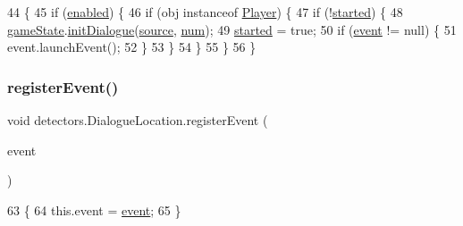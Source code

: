 \begin{DoxyCode}
44                                        \{
45         \textcolor{keywordflow}{if} (\mbox{\hyperlink{classdetectors_1_1_dialogue_location_a724e4fa1eb635dc794cc3a3fde90e947}{enabled}}) \{
46             \textcolor{keywordflow}{if} (obj instanceof \mbox{\hyperlink{class_player}{Player}}) \{
47                 \textcolor{keywordflow}{if} (!\mbox{\hyperlink{classdetectors_1_1_dialogue_location_a980ab73233584dd2c3f336cfea0c8662}{started}}) \{
48                     \mbox{\hyperlink{classdetectors_1_1_dialogue_location_a12ac7bef754e0189f746c02f7d82f5e7}{gameState}}.\mbox{\hyperlink{classstates_1_1_game_state_a5561200f7d5c881b84ce6369f6fad705}{initDialogue}}(\mbox{\hyperlink{classdetectors_1_1_dialogue_location_a55abbd4dc425d54ce35dfae63bd1b1e0}{source}}, 
      \mbox{\hyperlink{classdetectors_1_1_dialogue_location_ab19469a81933f3e7295fa59d70ac1f1b}{num}});
49                     \mbox{\hyperlink{classdetectors_1_1_dialogue_location_a980ab73233584dd2c3f336cfea0c8662}{started}} = \textcolor{keyword}{true};
50                     \textcolor{keywordflow}{if} (\mbox{\hyperlink{classdetectors_1_1_dialogue_location_ae8a0a0c1545951d8993d6e192edf22bd}{event}} != null) \{
51                         \textcolor{keyword}{event}.launchEvent();
52                     \}
53                 \}
54             \}
55         \}
56     \}
\end{DoxyCode}
\mbox{\label{classdetectors_1_1_dialogue_location_a85184de3666785a5a0a1af29b0a0308e}} 
\subsubsection{\texorpdfstring{register\+Event()}{registerEvent()}}
{\footnotesize\ttfamily void detectors.\+Dialogue\+Location.\+register\+Event (\begin{DoxyParamCaption}\item[{\mbox{\hyperlink{interfaceentities_1_1_event_launcher}{Event\+Launcher}}}]{event }\end{DoxyParamCaption})\hspace{0.3cm}{\ttfamily [inline]}}


\begin{DoxyCode}
63                                                    \{
64         this.\textcolor{keyword}{event} = \mbox{\hyperlink{classdetectors_1_1_dialogue_location_ae8a0a0c1545951d8993d6e192edf22bd}{event}};
65     \}
\end{DoxyCode}
\mbox{\label{classdetectors_1_1_dialogue_location_a6c5c259a57fd739b2274d4d259634745}} 
